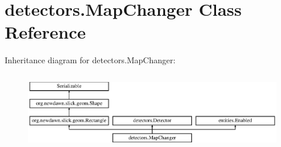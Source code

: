 \hypertarget{classdetectors_1_1_map_changer}{}\section{detectors.\+Map\+Changer Class Reference}
\label{classdetectors_1_1_map_changer}
Inheritance diagram for detectors.\+Map\+Changer\+:\begin{figure}[H]
\begin{center}
\leavevmode
\includegraphics[height=3.409437cm]{classdetectors_1_1_map_changer}
\end{center}
\end{figure}
